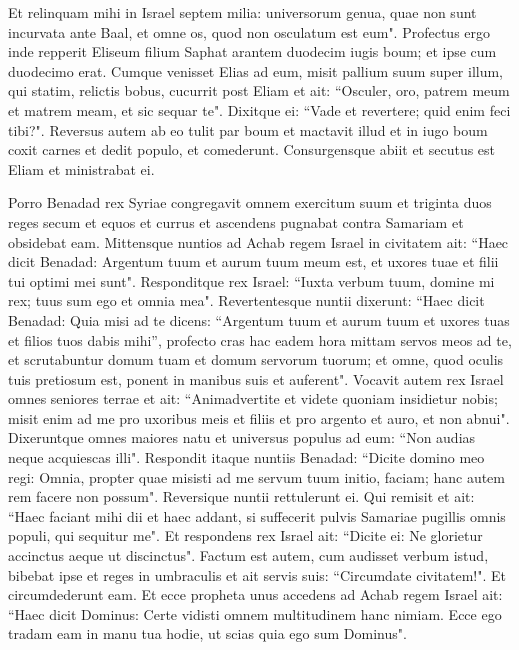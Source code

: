 \begin{biblechapter}
\verse Et relinquam mihi in Israel septem milia: universorum genua, quae non sunt incurvata ante Baal, et omne os, quod non osculatum est eum". 
\verse Profectus ergo inde repperit Eliseum filium Saphat arantem duodecim iugis boum; et ipse cum duodecimo erat. Cumque venisset Elias ad eum, misit pallium suum super illum, 
\verse qui statim, relictis bobus, cucurrit post Eliam et ait: “Osculer, oro, patrem meum et matrem meam, et sic sequar te". Dixitque ei: “Vade et revertere; quid enim feci tibi?". 
\verse Reversus autem ab eo tulit par boum et mactavit illud et in iugo boum coxit carnes et dedit populo, et comederunt. Consurgensque abiit et secutus est Eliam et ministrabat ei. 
\end{biblechapter}

\begin{biblechapter}  
\verse Porro Benadad rex Syriae congregavit omnem exercitum suum et triginta duos reges secum et equos et currus et ascendens pugnabat contra Samariam et obsidebat eam. 
\verse Mittensque nuntios ad Achab regem Israel in civitatem 
\verse ait: “Haec dicit Benadad: Argentum tuum et aurum tuum meum est, et uxores tuae et filii tui optimi mei sunt". 
\verse Responditque rex Israel: “Iuxta verbum tuum, domine mi rex; tuus sum ego et omnia mea". 
\verse Revertentesque nuntii dixerunt: “Haec dicit Benadad: Quia misi ad te dicens: “Argentum tuum et aurum tuum et uxores tuas et filios tuos dabis mihi”, 
\verse profecto cras hac eadem hora mittam servos meos ad te, et scrutabuntur domum tuam et domum servorum tuorum; et omne, quod oculis tuis pretiosum est, ponent in manibus suis et auferent". 
\verse Vocavit autem rex Israel omnes seniores terrae et ait: “Animadvertite et videte quoniam insidietur nobis; misit enim ad me pro uxoribus meis et filiis et pro argento et auro, et non abnui". 
\verse Dixeruntque omnes maiores natu et universus populus ad eum: “Non audias neque acquiescas illi". 
\verse Respondit itaque nuntiis Benadad: “Dicite domino meo regi: Omnia, propter quae misisti ad me servum tuum initio, faciam; hanc autem rem facere non possum". Reversique nuntii rettulerunt ei. 
\verse Qui remisit et ait: “Haec faciant mihi dii et haec addant, si suffecerit pulvis Samariae pugillis omnis populi, qui sequitur me". 
\verse Et respondens rex Israel ait: “Dicite ei: Ne glorietur accinctus aeque ut discinctus". 
\verse Factum est autem, cum audisset verbum istud, bibebat ipse et reges in umbraculis et ait servis suis: “Circumdate civitatem!". Et circumdederunt eam. 
\verse Et ecce propheta unus accedens ad Achab regem Israel ait: “Haec dicit Dominus: Certe vidisti omnem multitudinem hanc nimiam. Ecce ego tradam eam in manu tua hodie, ut scias quia ego sum Dominus". 

\end{biblechapter}
